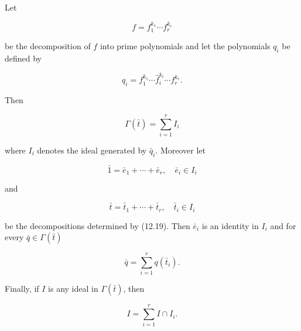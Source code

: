 Let

$$f = f_1^{k_1} \cdots f_r^{k_r}$$

be the decomposition of $f$ into prime polynomials and let the polynomials $q_i$ be defined by

$$q_i = f_1^{k_1} \cdots \hat{f}_i^{k_i} \cdots f_r^{k_r}.$$

Then

$$\Gamma(\bar{t}) = \sum_{i=1}^{r} I_i$$

where $I_i$ denotes the ideal generated by $\bar{q}_i$. Moreover let

$$\bar{1} = \bar{e}_1 + \cdots + \bar{e}_r, \quad \bar{e}_i \in I_i$$

and

$$\bar{t} = \bar{t}_1 + \cdots + \bar{t}_r, \quad \bar{t}_i \in I_i$$

be the decompositions determined by (12.19). Then $\bar{e}_i$ is an identity in $I_i$ and for every $\bar{q} \in \Gamma(\bar{t})$

$$\bar{q} = \sum_{i=1}^{r} q(\bar{t}_i).$$

Finally, if $I$ is any ideal in $\Gamma(\bar{t})$, then

$$I = \sum_{i=1}^{r} I \cap I_i.$$
